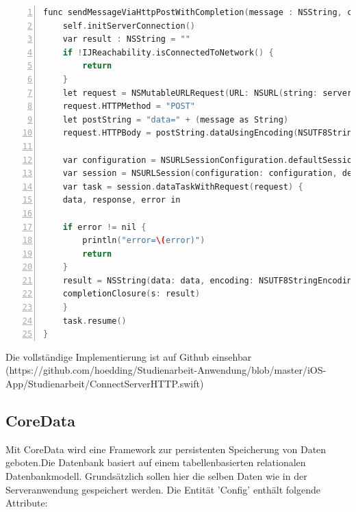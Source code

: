 \begin{lstlisting}[caption = Implementierung HTTP-Request mit Closure in Swift, language=C++, frame=single, breaklines=true,columns=fullflexible, commentstyle=\color{gray}\upshape, captionpos=b, numbers = left]
func sendMessageViaHttpPostWithCompletion(message : NSString, completionClosure : (s : NSString) -> ()) {
    self.initServerConnection()
    var result : NSString = ""
    if !IJReachability.isConnectedToNetwork() {
	    return
    }
    let request = NSMutableURLRequest(URL: NSURL(string: server)!)
    request.HTTPMethod = "POST"
    let postString = "data=" + (message as String)
    request.HTTPBody = postString.dataUsingEncoding(NSUTF8StringEncoding)
    
    var configuration = NSURLSessionConfiguration.defaultSessionConfiguration()
    var session = NSURLSession(configuration: configuration, delegate: self, delegateQueue: NSOperationQueue.mainQueue())
    var task = session.dataTaskWithRequest(request) {
    data, response, error in
    
    if error != nil {
	    println("error=\(error)")
	    return
	}
    result = NSString(data: data, encoding: NSUTF8StringEncoding)!
    completionClosure(s: result)
    }
    task.resume()
}
\end{lstlisting}

Die vollständige Implementierung ist auf Github einsehbar (https://github.com/hoedding/Studienarbeit-Anwendung/blob/master/iOS-App/Studienarbeit/ConnectServerHTTP.swift)

\subsection{CoreData}
Mit CoreData wird eine Framework zur persistenten Speicherung von Daten geboten.Die Datenbank basiert auf einem tabellenbasierten relationalen Datenbankmodell. Grundsätzlich sollen hier die selben Daten wie in der Serveranwendung gespeichert werden. Die Entität 'Config' enthält folgende Attribute:

